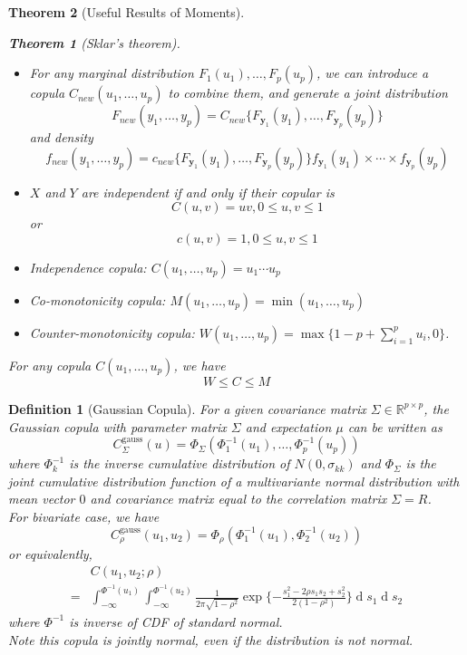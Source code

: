 \documentclass[11pt]{article}
\newtheorem{definition}{Definition}[section]
\newtheorem{theorem}{Theorem}[section]
\theoremstyle{definition}
\DeclareMathOperator{\diff}{d}
\begin{document}
\begin{theorem}[Useful Results of Moments]
\begin{theorem}[Sklar's theorem]
\begin{itemize}
\[  \]
  \item For any marginal distribution $F_1(u_1),\ldots, F_p(u_p)$, we can introduce a copula $C_{new}(u_1, \ldots, u_p)$ to combine them, and generate a joint distribution
  \[
F_{new}(y_1, \ldots, y_p)=C_{new}\{F_{\mathbf{y}_1}(y_1), \ldots, F_{\mathbf{y}_p}(y_p)\}
  \]
  and density
  \[
f_{new}(y_1, \ldots, y_p) =c_{new}\{F_{\mathbf{y}_1}(y_1), \ldots, F_{\mathbf{y}_p}(y_p)\}f_{\mathbf{y}_1}(y_1)\times\cdots\times f_{\mathbf{y}_p}(y_p)
  \]
  \item $X$ and $Y$ are independent if and only if their copular is
  \[
C(u,v)=uv, 0\leq u,v\leq 1
  \]
  or
  \[
c(u,v)=1, 0\leq u,v\leq 1
  \]
\end{itemize}
\end{theorem}
\begin{itemize}
  \item Independence copula: $C(u_1,\ldots, u_p)=u_1\cdots u_p$
  \item Co-monotonicity copula: $M(u_1,\ldots, u_p) = \min(u_1,\ldots, u_p)$
  \item Counter-monotonicity copula: $W(u_1,\ldots, u_p) = \max\{1-p+\sum_{i=1}^p u_i, 0\}$.
\end{itemize}
For any copula $C(u_1,\ldots, u_p)$, we have
\[
W\leq C\leq M
\]
\end{theorem}
\begin{definition}[Gaussian Copula]
\normalfont For a given covariance matrix $\Sigma\in\mathbb{R}^{p\times p}$, the Gaussian copula with parameter matrix $\Sigma$ and expectation $\mu$ can be written as
\[
C_{\Sigma}^{\text{gauss}}(u)=\Phi_{\Sigma}(\Phi_1^{-1}(u_1),\ldots, \Phi_p^{-1}(u_p))
\]
where $\Phi_{k}^{-1}$ is the inverse cumulative distribution of $N(0,\sigma_{kk})$ and $\Phi_{\Sigma}$ is the joint cumulative distribution function of a multivariante normal distribution with mean vector $0$ and covariance matrix equal to the correlation matrix $\Sigma = R$.\\
For bivariate case, we have
\[
C_\rho^{\text{gauss}}(u_1, u_2) = \Phi_\rho(\Phi_{1}^{-1}(u_1), \Phi_2^{-1}(u_2))
\]
or equivalently,
\begin{align*}
&C(u_1, u_2; \rho) \\
= &\int_{-\infty}^{\Phi^{-1}(u_1)}\int_{-\infty}^{\Phi^{-1}(u_2)}\frac{1}{2\pi\sqrt{1-\rho^2}}\exp\{-\frac{s_1^2-2\rho s_1s_2+s_2^2}{2(1-\rho^2)}\}\diff s_1\diff s_2
\end{align*}
where $\Phi^{-1}$ is inverse of CDF of standard normal.\\
Note this copula is jointly normal, even if the distribution is not normal.
\end{definition}
\end{document}

